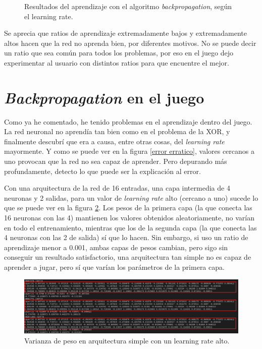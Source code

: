\begin{figure}[H]
	\caption{Resultados del aprendizaje con el algoritmo \textit{backpropagation}, según el learning rate.}
	\label{Backpropagation cambiando learning rate}
\end{figure}

Se aprecia que ratios de aprendizaje extremadamente bajos y extremadamente altos hacen que la red no aprenda bien, por diferentes motivos. No se puede decir un ratio que sea común para todos los problemas, por eso en el juego dejo experimentar al usuario con distintos ratios para que encuentre el mejor. 

\section{\textit{Backpropagation} en el juego}
Como ya he comentado, he tenido problemas en el aprendizaje dentro del juego. La red neuronal no aprendía tan bien como en el problema de la XOR, y finalmente descubrí que era a causa, entre otras cosas, del \textit{learning rate} mayormente. Y como se puede ver en la figura \ref{error erratico}, valores cercanos a uno provocan que la red no sea capaz de aprender. Pero depurando más profundamente, detecto lo que puede ser la explicación al error.

Con una arquitectura de la red de 16 entradas, una capa intermedia de 4 neuronas y 2 salidas, para un valor de \textit{learning rate} alto (cercano a uno) sucede lo que se puede ver en la figura \ref{alto learning rate arquitectura simple}. Los pesos de la primera capa (la que conecta las 16 neuronas con las 4) mantienen los valores obtenidos aleatoriamente, no varían en todo el entrenamiento, mientras que los de la segunda capa (la que conecta las 4 neuronas con las 2 de salida) sí que lo hacen. Sin embargo, si uso un ratio de aprendizaje menor a 0.001, ambas capas de pesos cambian, pero sigo sin conseguir un resultado satisfactorio, una arquitectura tan simple no es capaz de aprender a jugar, pero sí que varían los parámetros de la primera capa.

\begin{figure}[H]
	\centering
	\includegraphics[width=15cm]{archivos/imagenes/alto-learning-rate-arquitectura-simple.png}
	\caption{Varianza de peso en arquitectura simple con un learning rate alto.}
	\label{alto learning rate arquitectura simple}
\end{figure}


